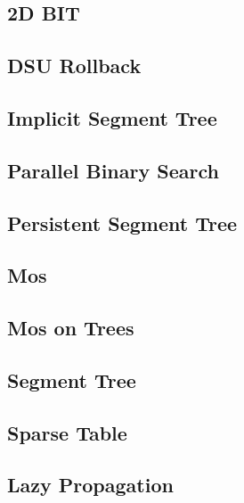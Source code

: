 \subsection{   2D BIT}
\raggedbottom
\hrulefill
\subsection{   DSU Rollback}
\raggedbottom
\hrulefill
\subsection{   Implicit Segment Tree}
\raggedbottom
\hrulefill
\subsection{   Parallel Binary Search}
\raggedbottom
\hrulefill
\subsection{   Persistent Segment Tree}
\raggedbottom
\hrulefill
\subsection{   Mos}
\raggedbottom
\hrulefill
\subsection{   Mos on Trees}
\raggedbottom
\hrulefill
\subsection{   Segment Tree}
\raggedbottom
\hrulefill
\subsection{   Sparse Table}
\raggedbottom
\hrulefill
\subsection{   Lazy Propagation}
\raggedbottom
\hrulefill
